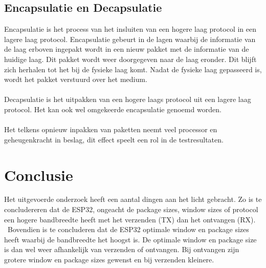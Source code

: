 \documentclass[../DCM2_Verslag.tex]{subfiles}
\begin{document}
\subsection{Encapsulatie en Decapsulatie}
Encapsulatie is het process van het insluiten van een hogere laag protocol in een lagere laag protocol. Encapsulatie gebeurt in de lagen waarbij de informatie van de laag erboven ingepakt wordt in een nieuw pakket met de informatie van de huidige laag. Dit pakket wordt weer doorgegeven naar de laag eronder. Dit blijft zich herhalen tot het bij de fysieke laag komt. Nadat de fysieke laag gepasseerd is, wordt het pakket verstuurd over het medium.\\\\
Decapsulatie is het uitpakken van een hogere laags protocol uit een lagere laag protocol. Het kan ook wel omgekeerde encapsulatie genoemd worden.\\\\
Het telkens opnieuw inpakken van paketten neemt veel processor en geheugenkracht in beslag, dit effect speelt een rol in de testresultaten.

\clearpage
\section{Conclusie}
Het uitgevoerde onderzoek heeft een aantal dingen aan het licht gebracht. Zo is te concludereren dat de ESP32, ongeacht de package sizes, window sizes of protocol een hogere bandbreedte heeft met het verzenden (TX) dan het ontvangen (RX). \\\ Bovendien is te concluderen dat de ESP32 optimale window en package sizes heeft waarbij de bandbreedte het hoogst is. De optimale window en package size is dan wel weer afhankelijk van verzenden of ontvangen. Bij ontvangen zijn grotere window en package sizes gewenst en bij verzenden kleinere.
\end{document}
